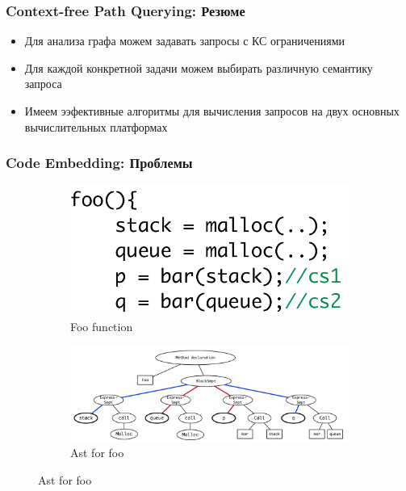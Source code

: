 \documentclass[xcolor=table,english]{beamer}
\begin{document}
\begin{frame}[fragile] \frametitle{Context-free Path Querying: Резюме}
    \begin{itemize}
        \item Для анализа графа можем задавать запросы с КС ограничениями
        \item Для каждой конкретной задачи можем выбирать различную семантику запроса
        \item Имеем ээфективные алгоритмы для вычисления запросов на двух основных вычислительных платформах
    \end{itemize}
\end{frame}

\begin{frame}[fragile] \frametitle{Code Embedding: Проблемы}
    \begin{minipage}[m]{\linewidth}
        \begin{figure}
            \centering
            \begin{subfigure}[b]{0.35\textwidth}
                \includegraphics[width=\textwidth]{figures/code_for_ast.png}
                \caption{Foo function}
            \end{subfigure}
            \hfill
            \begin{subfigure}[b]{0.55\textwidth}
                \includegraphics[width=\textwidth]{figures/ast_approach.png}
                \caption{Ast for foo}
            \end{subfigure}

\end{figure}
\end{minipage}
\end{frame}
\end{document}
